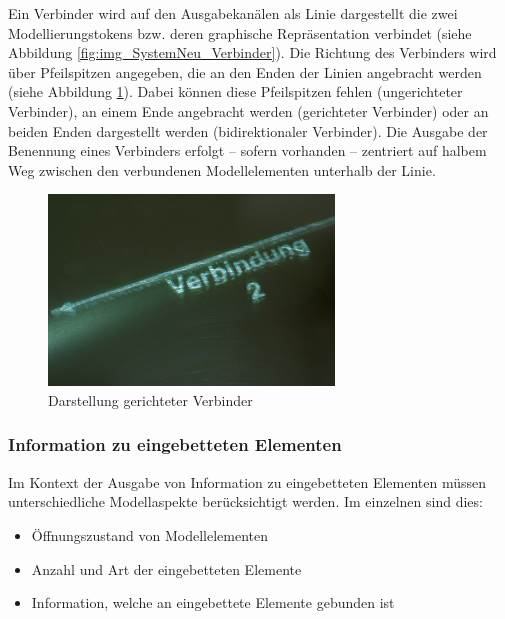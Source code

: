 Ein Verbinder wird auf den Ausgabekanälen als Linie dargestellt die zwei Modellierungstokens bzw. deren graphische Repräsentation verbindet (siehe Abbildung \ref{fig:img_SystemNeu_Verbinder}). Die Richtung des Verbinders wird über Pfeilspitzen angegeben, die an den Enden der Linien angebracht werden (siehe Abbildung \ref{fig:img_SystemNeu_VerbindungGerichtetTisch}). Dabei können diese Pfeilspitzen fehlen (ungerichteter Verbinder), an einem Ende angebracht werden (gerichteter Verbinder) oder an beiden Enden dargestellt werden (bidirektionaler Verbinder). Die Ausgabe der Benennung eines Verbinders erfolgt -- sofern vorhanden -- zentriert auf halbem Weg zwischen den verbundenen Modellelementen unterhalb der Linie. 

\begin{figure}[htbp]
	\centering
		\includegraphics[height=2in]{img/SystemNeu/VerbindungGerichtetTisch.jpg}
	\caption{Darstellung gerichteter Verbinder}
	\label{fig:img_SystemNeu_VerbindungGerichtetTisch}
\end{figure}


\subsubsection{Information zu eingebetteten Elementen} %
\label{ssub:information_zu_eingebetteten_elementen}

Im Kontext der Ausgabe von Information zu eingebetteten Elementen müssen unterschiedliche Modellaspekte berücksichtigt werden. Im einzelnen sind dies:
\begin{itemize}
 \item Öffnungszustand von Modellelementen
 \item Anzahl und Art der eingebetteten Elemente
 \item Information, welche an eingebettete Elemente gebunden ist
\end{itemize}

